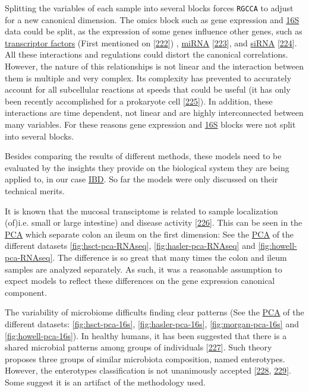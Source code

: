 \documentclass[
  12pt,
  a4paper,
  twoside,
  openright]{book}
\begin{document}
Splitting the variables of each sample into several blocks forces \texttt{RGCCA} to adjust for a new canonical dimension.
The omics block such as gene expression and \protect\hyperlink{acronyms_16S}{16S} data could be split, as the expression of some genes influence other genes, such as \href{https://en.wikipedia.org/wiki/Transcription_factor}{transcriptor factors} (First mentioned on {[}\protect\hyperlink{ref-stillman1984}{222}{]}) , \href{https://en.wikipedia.org/wiki/MicroRNA}{miRNA} {[}\protect\hyperlink{ref-lee1993}{223}{]}, and \href{https://en.wikipedia.org/wiki/Small_interfering_RNA}{siRNA} {[}\protect\hyperlink{ref-hamilton1999}{224}{]}.
All these interactions and regulations could distort the canonical correlations.
However, the nature of this relationships is not linear and the interaction between them is multiple and very complex.
Its complexity has prevented to accurately account for all subcellular reactions at speeds that could be useful (it has only been recently accomplished for a prokaryote cell {[}\protect\hyperlink{ref-thornburg2022}{225}{]}).
In addition, these interactions are time dependent, not linear and are highly interconnected between many variables.
For these reasons gene expression and \protect\hyperlink{acronyms_16S}{16S} blocks were not split into several blocks.

Besides comparing the results of different methods, these models need to be evaluated by the insights they provide on the biological system they are being applied to, in our case \protect\hyperlink{acronyms_IBD}{IBD}.
So far the models were only discussed on their technical merits.

It is known that the mucosal transciptome is related to sample localization (of)i.e.
small or large intestine) and disease activity {[}\protect\hyperlink{ref-criss2021}{226}{]}.
This can be seen in the \protect\hyperlink{acronyms_PCA}{PCA} which separate colon an ileum on the first dimension: See the \protect\hyperlink{acronyms_PCA}{PCA} of the different datasets \ref{fig:hsct-pca-RNAseq}, \ref{fig:hasler-pca-RNAseq} and \ref{fig:howell-pca-RNAseq}.
The difference is so great that many times the colon and ileum samples are analyzed separately.
As such, it was a reasonable assumption to expect models to reflect these differences on the gene expression canonical component.

The variability of microbiome difficults finding clear patterns (See the \protect\hyperlink{acronyms_PCA}{PCA} of the different datasets: \ref{fig:hsct-pca-16s}, \ref{fig:hasler-pca-16s}, \ref{fig:morgan-pca-16s} and \ref{fig:howell-pca-16s}).
In healthy humans, it has been suggested that there is a shared microbial patterns among groups of individuals {[}\protect\hyperlink{ref-arumugam2011}{227}{]}. Such theory proposes three groups of similar microbiota composition, named enterotypes. However, the enterotypes classification is not unanimously accepted {[}\protect\hyperlink{ref-koren2013}{228}, \protect\hyperlink{ref-cheng2019}{229}{]}.
Some suggest it is an artifact of the methodology used.
\end{document}
